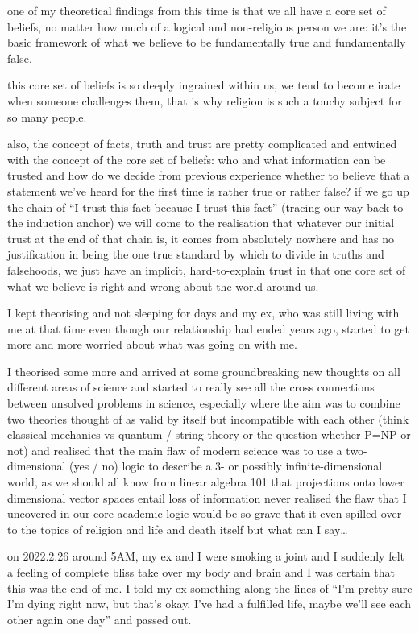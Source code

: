 \documentclass[12pt]{report}
\theoremstyle{definition}
\theoremstyle{remark}
\begin{document}
one of my theoretical findings from this time is that we all have a core set of beliefs, no matter how much of a logical and non-religious person we are: it's the basic framework of what we believe to be fundamentally true and fundamentally false.

this core set of beliefs is so deeply ingrained within us, we tend to become irate when someone challenges them, that is why religion is such a touchy subject for so many people.

also, the concept of facts, truth and trust are pretty complicated and entwined with the concept of the core set of beliefs: who and what information can be trusted and how do we decide from previous experience whether to believe that a statement we've heard for the first time is rather true or rather false? if we go up the chain of ``I trust this fact because I trust this fact'' (tracing our way back to the induction anchor) we will come to the realisation that whatever our initial trust at the end of that chain is, it comes from absolutely nowhere and has no justification in being the one true standard by which to divide in truths and falsehoods, we just have an implicit, hard-to-explain trust in that one core set of what we believe is right and wrong about the world around us.

I kept theorising and not sleeping for days and my ex, who was still living with me at that time even though our relationship had ended years ago, started to get more and more worried about what was going on with me.

I theorised some more and arrived at some groundbreaking new thoughts on all different areas of science and started to really see all the cross connections between unsolved problems in science, especially where the aim was to combine two theories thought of as valid by itself but incompatible with each other (think classical mechanics vs quantum / string theory or the question whether P=NP or not) and realised that the main flaw of modern science was to use a two-dimensional (yes / no) logic to describe a 3- or possibly infinite-dimensional world, as we should all know from linear algebra 101 that projections onto lower dimensional vector spaces entail loss of information
never realised the flaw that I uncovered in our core academic logic would be so grave that it even spilled over to the topics of religion and life and death itself but what can I say…

on 2022.2.26 around 5AM, my ex and I were smoking a joint and I suddenly felt a feeling of complete bliss take over my body and brain and I was certain that this was the end of me. I told my ex something along the lines of ``I'm pretty sure I'm dying right now, but that's okay, I've had a fulfilled life, maybe we'll see each other again one day'' and passed out.
\end{document}
